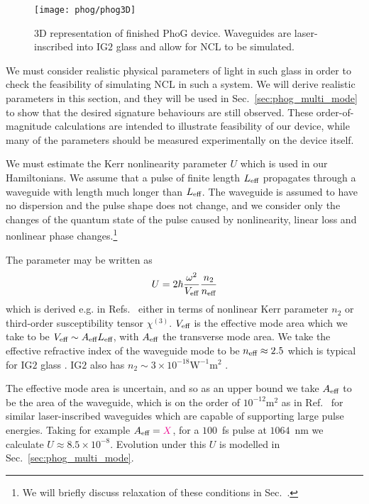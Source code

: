 \begin{figure}[htp]
\centering
\texttt{[image: phog/phog3D]}
\caption{\label{fig:phog_realistic} $3$D representation of finished PhoG device. Waveguides are laser-inscribed into IG$2$ glass and allow for NCL to be simulated.}
\end{figure}

We must consider realistic physical parameters of light in such glass in order to check the feasibility of simulating NCL in such a system. We will derive realistic parameters in this section, and they will be used in Sec.~\ref{sec:phog_multi_mode} to show that the desired signature behaviours are still observed. These order-of-magnitude calculations are intended to illustrate feasibility of our device, while many of the parameters should be measured experimentally on the device itself.

We must estimate the Kerr nonlinearity parameter $U$ which is used in our Hamiltonians. We assume that a pulse of finite length $L_{\text{eff}}$ propagates through a waveguide with length much longer than $L_{\text{eff}}$. The waveguide is assumed to have no dispersion and the pulse shape does not change, and we consider only the changes of the quantum state of the pulse caused by nonlinearity, linear loss and nonlinear phase changes.\footnote{We will briefly discuss relaxation of these conditions in Sec.~. %
}

The parameter may be written as 
\begin{equation}
U = 2 \hbar \frac{\omega^2}{V_{\text{eff}}} \frac{n_2}{n_{\text{eff}}}
\end{equation}
which is derived e.g. in Refs.~\cite{Imoto1985, Kitagawa1986, Drummond1980} either in terms of nonlinear Kerr parameter $n_2$ or third-order susceptibility tensor $\chi^{\left(3\right)}$. $V_{\text{eff}}$ is the effective mode area which we take to be $V_{\text{eff}} \sim A_{\text{eff}} L_{\text{eff}}$, with $A_{\text{eff}}$ the transverse mode area. We take the effective refractive index of the waveguide mode to be $n_{\text{eff}} \approx 2.5$ which is typical for IG$2$ glass .  IG$2$ also has $n_2 \sim 3 \times 10^{-18} \text{W}^{-1} \text{m}^2$ .

The effective mode area is uncertain, and so as an upper bound we take $A_{\text{eff}}$ to be the area of the waveguide, which is on the order of $10^{-12}\text{m}^2$ as in Ref.~ for similar laser-inscribed waveguides which are capable of supporting large pulse energies. Taking for example $A_{\text{eff}} = \textcolor{magenta}{X}$, for a $100$~fs pulse at $1064$~nm we calculate $U \approx 8.5\times 10^{-8}$. Evolution under this $U$ is modelled in Sec.~\ref{sec:phog_multi_mode}.

